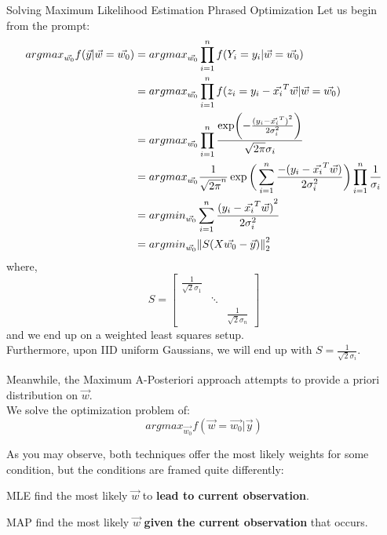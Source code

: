 \begin{ln-explain}{Solving Maximum Likelihood Estimation Phrased Optimization}{}
    Let us begin from the prompt:
    \begin{align*}
        {argmax}_{\vec{w_0}} f (\vec{y} | \vec{w} = \vec{w_0})
        &= {argmax}_{\vec{w_0}} \prod_{i = 1}^n f(Y_i = y_i | \vec{w} = \vec{w_0}) \\
        &= {argmax}_{\vec{w_0}} \prod_{i = 1}^n f(z_i = y_i - \vec{x_i}^T \vec{w} | \vec{w} = \vec{w_0}) \\
        &= {argmax}_{\vec{w_0}} \prod_{i = 1}^n \frac{\exp(-\frac{{(y_i - \vec{x_i}^T)}^2}{2\sigma_i^2})}{\sqrt{2 \pi} \sigma_i} \\
        &= {argmax}_{\vec{w_0}} \frac{1}{{\sqrt{2\pi}}^n} \exp \bigg( \sum_{i = 1}^n \frac{-(y_i - \vec{x_i}^T \vec{w})}{2 \sigma_i^2} \bigg) \prod_{i = 1}^n \frac{1}{\sigma_i} \\
        &= {argmin}_{\vec{w_0}} \sum_{i = 1}^n \frac{{(y_i - \vec{x_i}^T \vec{w})}^2}{2 \sigma_i^2} \\
        &= {argmin}_{\vec{w_0}} \pnorm[2]{S(X \vec{w_0} - \vec{y})}{2}
    \end{align*}
    where,
    \[
        S =
        \begin{bmatrix}
            \frac{1}{\sqrt{2} \sigma_1} & & \\
            & \ddots & \\
            & & \frac{1}{\sqrt{2} \sigma_n}
        \end{bmatrix}
    \]
    and we end up on a weighted least squares setup. \\
    Furthermore, upon IID uniform Gaussians, we will end up with $S = \frac{1}{\sqrt{2} \sigma_i}$.
\end{ln-explain}

Meanwhile, the Maximum A-Posteriori approach attempts to provide a priori distribution on $\vec{w}$. \\
We solve the optimization problem of:
\[
    {argmax}_{\vec{w_0}} f(\vec{w} = \vec{w_0} | \vec{y})
\]

As you may observe, both techniques offer the most likely weights for some condition, but the conditions are framed quite differently:
\begin{bindenum}
    \item MLE find the most likely $\vec{w}$ to \textbf{lead to current observation}.
    \item MAP find the most likely $\vec{w}$ \textbf{given the current observation} that occurs.
\end{bindenum}

